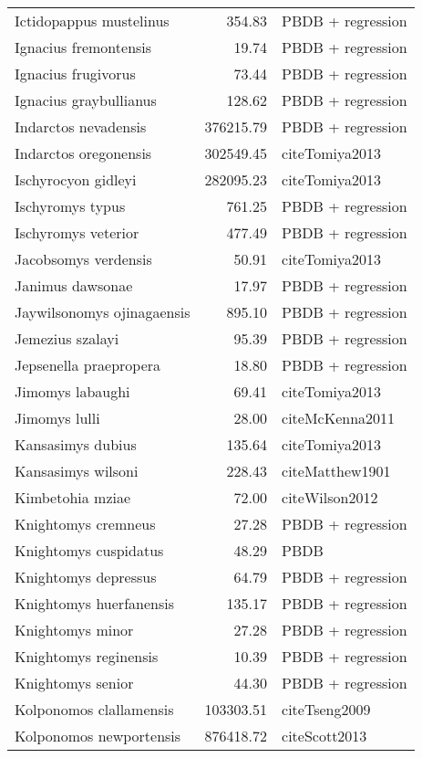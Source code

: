 \begin{table}[ht]
\begin{tabular}{lrl}
  Ictidopappus mustelinus & 354.83 & PBDB + regression \\ 
  Ignacius fremontensis & 19.74 & PBDB + regression \\ 
  Ignacius frugivorus & 73.44 & PBDB + regression \\ 
  Ignacius graybullianus & 128.62 & PBDB + regression \\ 
  Indarctos nevadensis & 376215.79 & PBDB + regression \\ 
  Indarctos oregonensis & 302549.45 & cite{Tomiya2013} \\ 
  Ischyrocyon gidleyi & 282095.23 & cite{Tomiya2013} \\ 
  Ischyromys typus & 761.25 & PBDB + regression \\ 
  Ischyromys veterior & 477.49 & PBDB + regression \\ 
  Jacobsomys verdensis & 50.91 & cite{Tomiya2013} \\ 
  Janimus dawsonae & 17.97 & PBDB + regression \\ 
  Jaywilsonomys ojinagaensis & 895.10 & PBDB + regression \\ 
  Jemezius szalayi & 95.39 & PBDB + regression \\ 
  Jepsenella praepropera & 18.80 & PBDB + regression \\ 
  Jimomys labaughi & 69.41 & cite{Tomiya2013} \\ 
  Jimomys lulli & 28.00 & cite{McKenna2011} \\ 
  Kansasimys dubius & 135.64 & cite{Tomiya2013} \\ 
  Kansasimys wilsoni & 228.43 & cite{Matthew1901} \\ 
  Kimbetohia mziae & 72.00 & cite{Wilson2012} \\ 
  Knightomys cremneus & 27.28 & PBDB + regression \\ 
  Knightomys cuspidatus & 48.29 & PBDB \\ 
  Knightomys depressus & 64.79 & PBDB + regression \\ 
  Knightomys huerfanensis & 135.17 & PBDB + regression \\ 
  Knightomys minor & 27.28 & PBDB + regression \\ 
  Knightomys reginensis & 10.39 & PBDB + regression \\ 
  Knightomys senior & 44.30 & PBDB + regression \\ 
  Kolponomos clallamensis & 103303.51 & cite{Tseng2009} \\ 
  Kolponomos newportensis & 876418.72 & cite{Scott2013} \\ 

\end{tabular}
\end{table}
